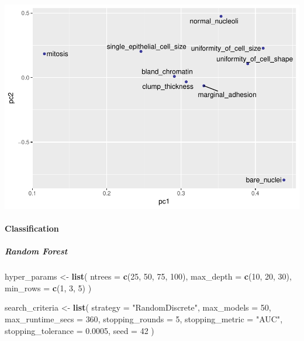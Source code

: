 \documentclass[]{article}
\newenvironment{Shaded}{\begin{snugshade}}{\end{snugshade}}
\newcommand{\KeywordTok}[1]{\textcolor[rgb]{0.13,0.29,0.53}{\textbf{{#1}}}}
\newcommand{\DataTypeTok}[1]{\textcolor[rgb]{0.13,0.29,0.53}{{#1}}}
\newcommand{\DecValTok}[1]{\textcolor[rgb]{0.00,0.00,0.81}{{#1}}}
\newcommand{\FloatTok}[1]{\textcolor[rgb]{0.00,0.00,0.81}{{#1}}}
\newcommand{\StringTok}[1]{\textcolor[rgb]{0.31,0.60,0.02}{{#1}}}
\newcommand{\NormalTok}[1]{{#1}}
\let\oldparagraph\paragraph
\renewcommand{\paragraph}[1]{\oldparagraph{#1}\mbox{}}
\let\oldsubparagraph\subparagraph
\renewcommand{\subparagraph}[1]{\oldsubparagraph{#1}\mbox{}}
\begin{document}
\includegraphics{webinar_code_files/figure-latex/pca_features-1.pdf}

\paragraph{Classification}\label{classification-1}

\subparagraph{Random Forest}\label{random-forest}

\begin{Shaded}
\begin{Highlighting}[]
\NormalTok{hyper_params <-}\StringTok{ }\KeywordTok{list}\NormalTok{(}
                     \DataTypeTok{ntrees =} \KeywordTok{c}\NormalTok{(}\DecValTok{25}\NormalTok{, }\DecValTok{50}\NormalTok{, }\DecValTok{75}\NormalTok{, }\DecValTok{100}\NormalTok{),}
                     \DataTypeTok{max_depth =} \KeywordTok{c}\NormalTok{(}\DecValTok{10}\NormalTok{, }\DecValTok{20}\NormalTok{, }\DecValTok{30}\NormalTok{),}
                     \DataTypeTok{min_rows =} \KeywordTok{c}\NormalTok{(}\DecValTok{1}\NormalTok{, }\DecValTok{3}\NormalTok{, }\DecValTok{5}\NormalTok{)}
                     \NormalTok{)}

\NormalTok{search_criteria <-}\StringTok{ }\KeywordTok{list}\NormalTok{(}
                        \DataTypeTok{strategy =} \StringTok{"RandomDiscrete"}\NormalTok{, }
                        \DataTypeTok{max_models =} \DecValTok{50}\NormalTok{,}
                        \DataTypeTok{max_runtime_secs =} \DecValTok{360}\NormalTok{,}
                        \DataTypeTok{stopping_rounds =} \DecValTok{5}\NormalTok{,          }
                        \DataTypeTok{stopping_metric =} \StringTok{"AUC"}\NormalTok{,      }
                        \DataTypeTok{stopping_tolerance =} \FloatTok{0.0005}\NormalTok{,}
                        \DataTypeTok{seed =} \DecValTok{42}
                        \NormalTok{)}
\end{Highlighting}
\end{Shaded}
\end{document}
